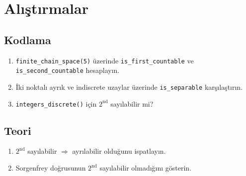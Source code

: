 \section{Alıştırmalar}

\subsection*{Kodlama}

\begin{enumerate}[label=K\arabic*.]
\item \texttt{finite\_chain\_space(5)} üzerinde \texttt{is\_first\_countable} ve
      \texttt{is\_second\_countable} hesaplayın.
\item İki noktalı ayrık ve indiscrete uzaylar üzerinde \texttt{is\_separable} karşılaştırın.
\item \texttt{integers\_discrete()} için $2^{\text{nd}}$ sayılabilir mi?
\end{enumerate}

\subsection*{Teori}

\begin{enumerate}[label=T\arabic*.]
\item $2^{\text{nd}}$ sayılabilir $\Rightarrow$ ayrılabilir olduğunu ispatlayın.
\item Sorgenfrey doğrusunun $2^{\text{nd}}$ sayılabilir olmadığını gösterin.
\end{enumerate}
